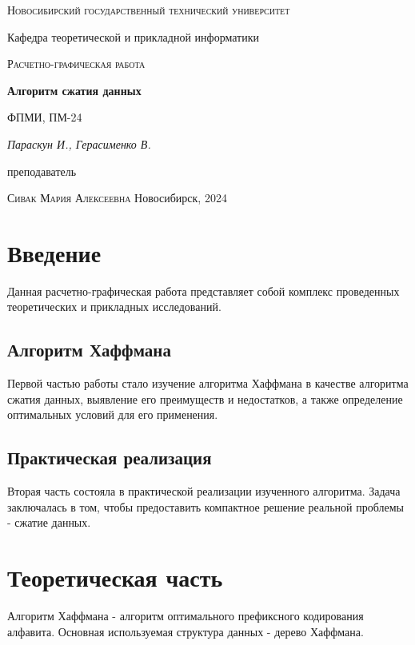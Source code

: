 \documentclass[12pt, a4paper]{article}
\begin{document}
\begin{titlepage}
  \centering
  \textsc{Новосибирский государственный технический университет}\par
  \vspace{1mm}
  Кафедра теоретической и прикладной информатики\par
  \vspace{4cm}
  \textsc{Расчетно-графическая работа}\par
  {\huge\bfseries Алгоритм сжатия данных\par}
  \vspace{1cm}
  {\scriptsize ФПМИ, ПМ-24\par}
  \vspace{1mm}
  {\itshape\large Параскун И., Герасименко В.\par}
  \vfill
  {\small преподаватель\par}
  \vspace{1mm}
  \textsc{Сивак Мария Алексеевна}
  \vfill
  \large{Новосибирск, 2024}
\end{titlepage}

\tableofcontents

\newpage

\section{Введение}
Данная расчетно-графическая работа представляет собой комплекс проведенных
теоретических и прикладных исследований.
\subsection{Алгоритм Хаффмана}
Первой частью работы стало изучение алгоритма Хаффмана в качестве
алгоритма сжатия данных, выявление его преимуществ и недостатков, а также
определение оптимальных условий для его применения.
\subsection{Практическая реализация}
Вторая часть состояла в практической реализации изученного алгоритма.
Задача заключалась в том, чтобы предоставить компактное решение реальной
проблемы - сжатие данных.

\section{Теоретическая часть}
Алгоритм Хаффмана - алгоритм оптимального префиксного кодирования алфавита.
Основная используемая структура данных - дерево Хаффмана.
\end{document}
